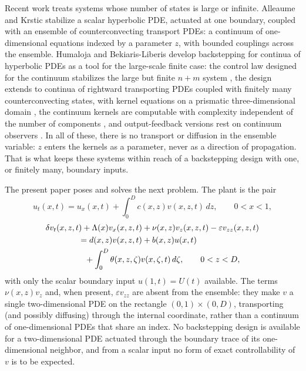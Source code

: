 \documentclass[12pt]{article}
\theoremstyle{plain}
\theoremstyle{remark}
\begin{document}
Recent work treats systems whose number of states is large or infinite. Alleaume and Krstic \cite{AlleaumeKrstic2025} stabilize a scalar hyperbolic PDE, actuated at one boundary, coupled with an ensemble of counterconvecting transport PDEs: a continuum of one-dimensional equations indexed by a parameter $z$, with bounded couplings across the ensemble. Humaloja and Bekiaris-Liberis develop backstepping for continua of hyperbolic PDEs as a tool for the large-scale finite case: the control law designed for the continuum stabilizes the large but finite $n+m$ system \cite{HumalojaBLTAC2025}, the design extends to continua of rightward transporting PDEs coupled with finitely many counterconvecting states, with kernel equations on a prismatic three-dimensional domain \cite{HumalojaBLAut2025}, the continuum kernels are computable with complexity independent of the number of components \cite{HumalojaBLSCL2025}, and output-feedback versions rest on continuum observers \cite{HumalojaBLAut2026of}. In all of these, there is no transport or diffusion in the ensemble variable: $z$ enters the kernels as a parameter, never as a direction of propagation. That is what keeps these systems within reach of a backstepping design with one, or finitely many, boundary inputs.

The present paper poses and solves the next problem. The plant is the pair
\begin{equation}
 u_t(x,t)
 =u_x(x,t)+\int_0^D c(x,z)v(x,z,t)\,dz,
 \qquad 0<x<1,
 \label{eq:gen-u}
\end{equation}
\begin{align}
 &\delta v_t(x,z,t)+\Lambda(x)v_x(x,z,t)+\nu(x,z)v_z(x,z,t)-\varepsilon v_{zz}(x,z,t)
 \nonumber\\
 &\qquad\qquad=d(x,z)v(x,z,t)+b(x,z)u(x,t)
 \nonumber\\
 &\qquad\qquad\hphantom{=}
 +\int_0^D\theta(x,z,\zeta)v(x,\zeta,t)\,d\zeta,
 \qquad 0<z<D,
 \label{eq:gen-v}
\end{align}
with only the scalar boundary input $u(1,t)=U(t)$ available. The terms $\nu(x,z)v_z$ and, when present, $\varepsilon v_{zz}$ are absent from the ensemble: they make $v$ a single two-dimensional PDE on the rectangle $(0,1)\times(0,D)$, transporting (and possibly diffusing) through the internal coordinate, rather than a continuum of one-dimensional PDEs that share an index. No backstepping design is available for a two-dimensional PDE actuated through the boundary trace of its one-dimensional neighbor, and from a scalar input no form of exact controllability of $v$ is to be expected.
\end{document}
